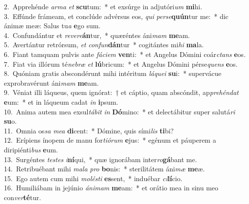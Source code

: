 {2.~}Apprehénde \textit{ar}\textit{ma} \textit{et} \textbf{scu}tum:~* et exsúrge in adjutóri\textit{um} \textbf{mi}hi.\\
{3.~}Effúnde frámeam, et conclúde advérsus eos, \textit{qui} \textit{per}\textit{se}\textbf{quún}tur me:~* dic ánimæ meæ: Salus tu\textit{a} \textbf{e}go sum.\\
{4.~}Confundántur et \textit{re}\textit{ve}\textit{re}\textbf{án}tur,~* quæréntes áni\textit{mam} \textbf{me}am.\\
{5.~}Avertántur retrórsum, \textit{et} \textit{con}\textit{fun}\textbf{dán}tur~* cogitántes mi\textit{hi} \textbf{ma}la.\\
{6.~}Fiant tamquam pulvis ante \textit{fá}\textit{ci}\textit{em} \textbf{ven}ti:~* et Angelus Dómini coár\textit{ctans} \textbf{e}os.\\
{7.~}Fiat via illórum té\textit{ne}\textit{bræ} \textit{et} \textbf{lú}bricum:~* et Angelus Dómini pérse\textit{quens} \textbf{e}os.\\
{8.~}Quóniam gratis abscondérunt mihi intéritum \textit{lá}\textit{que}\textit{i} \textbf{su}i:~* supervácue exprobravérunt áni\textit{mam} \textbf{me}am.\\
{9.~}Véniat illi láqueus, quem ignórat:~† et cáptio, quam abscóndit, ap\textit{pre}\textit{hén}\textit{dat} \textbf{e}um:~* et in láqueum cadat \textit{in} \textbf{i}psum.\\
{10.~}Anima autem mea exsul\textit{tá}\textit{bit} \textit{in} \textbf{Dó}mino:~* et delectábitur super salutá\textit{ri} \textbf{su}o.\\
{11.~}Omnia os\textit{sa} \textit{me}\textit{a} \textbf{di}cent:~* Dómine, quis sími\textit{lis} \textbf{ti}bi?\\
{12.~}Erípiens ínopem de manu for\textit{ti}\textit{ó}\textit{rum} \textbf{e}jus:~* egénum et páuperem a diripiénti\textit{bus} \textbf{e}um.\\
{13.~}Surgéntes \textit{te}\textit{stes} \textit{i}\textbf{ní}qui,~* quæ ignorábam inter\textit{ro}\textbf{gá}bant me.\\
{14.~}Retribuébant mihi \textit{ma}\textit{la} \textit{pro} \textbf{bo}nis:~* sterilitátem áni\textit{mæ} \textbf{me}æ.\\
{15.~}Ego autem cum mihi \textit{mo}\textit{lé}\textit{sti} \textbf{es}sent,~* induébar \textit{ci}\textbf{lí}cio.\\
{16.~}Humiliábam in jejúnio \textit{á}\textit{ni}\textit{mam} \textbf{me}am:~* et orátio mea in sinu meo con\textit{ver}\textbf{té}tur.\\
